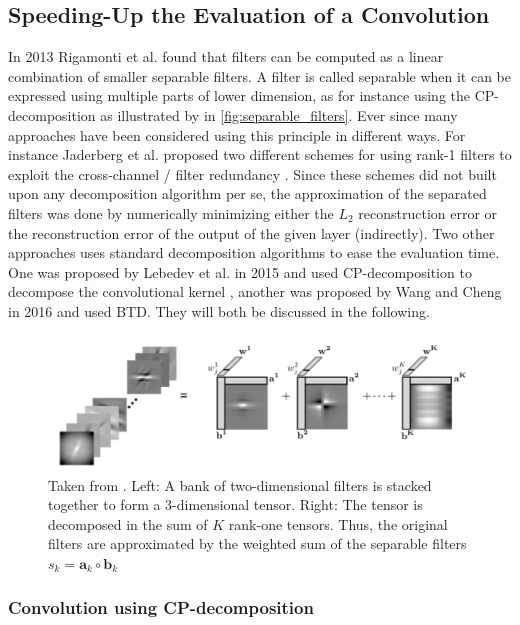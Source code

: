 \subsection{Speeding-Up the Evaluation of a Convolution}
In 2013 Rigamonti et al. \cite{Rigamonti2013} found that filters can be computed as a linear combination of smaller separable filters. A filter is called separable when it can be expressed using multiple parts of lower dimension, as for instance using the CP-decomposition as illustrated by \cite{Sironi2015} in \autoref{fig:separable_filters}. Ever since many approaches have been considered using this principle in different ways. For instance Jaderberg et al. proposed two different schemes for using rank-1 filters to exploit the cross-channel / filter redundancy \cite{Jaderberg2014}. Since these schemes did not built upon any decomposition algorithm per se, the approximation of the separated filters was done by numerically minimizing either the $L_2$ reconstruction error or the reconstruction error of the output of the given layer (indirectly). Two other approaches uses standard decomposition algorithms to ease the evaluation time. One was proposed by Lebedev et al. in 2015 and used CP-decomposition to decompose the convolutional kernel \cite{Lebedev2015}, another was proposed by Wang and Cheng in 2016 and used BTD. They will both be discussed in the following.

\begin{figure}
    \centering
    \captionsetup{width=.9\linewidth}
    \includegraphics[width=.8\linewidth]{Pics/03_Previous_work/separable_filters.png}
    \caption{Taken from \cite{Sironi2015}. Left: A bank of two-dimensional filters is stacked together to form a 3-dimensional tensor. Right: The tensor is decomposed in the sum of $K$ rank-one tensors. Thus, the original filters are approximated by the weighted sum of the separable filters $s_k = \boldsymbol{a}_k \circ \boldsymbol{b}_k$}
    \label{fig:separable_filters}
\end{figure}

\subsubsection{Convolution using CP-decomposition} \label{tex:convUsingCP}

